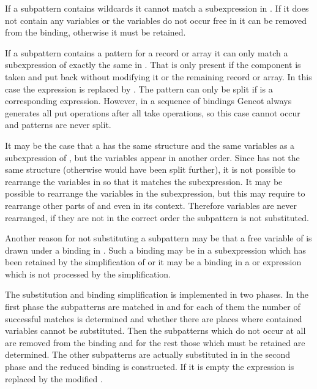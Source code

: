 If a subpattern  contains wildcards it cannot match a subexpression in . If it does not contain any variables
or the variables do not occur free in  it can be removed from the binding, otherwise it must be retained.

If a subpattern  contains a  pattern for a record or array it can only match a  subexpression 
of exactly the same in . That is only present if the component is taken and put back without modifying it or the 
remaining record or array. In this case the  expression is replaced by . 
The  pattern can only be split if  is a corresponding  expression. However, in a sequence
of bindings Gencot always generates all put operations after all take operations, so this case cannot occur and  
patterns are never split.

It may be the case that a  has the same structure and the same variables as a subexpression of , but the
variables appear in another order. Since  has not the same structure (otherwise  would have been split
further), it is not possible to rearrange the variables in  so that it matches the subexpression. It may be possible 
to rearrange the variables in the subexpression, but this may require to rearrange other parts of  and even in 
its context. Therefore variables are never rearranged, if they are not in the correct order the subpattern is not substituted.

Another reason for not substituting a subpattern  may be that a free variable of  is drawn under a binding
in . Such a binding may be in a  subexpression which has been retained by the simplification of 
or it may be a binding in a  or  expression which is not processed by the simplification.

The substitution and binding simplification is implemented in two phases. In the first phase the subpatterns are matched in 
 and for each of them the number of successful matches is determined and whether there are places where contained 
variables cannot be substituted. Then the subpatterns which do not occur at all are removed from the binding and for the rest
those which must be retained are determined. The other subpatterns are actually substituted in  in the second phase 
and the reduced binding is constructed. If it is empty the  expression is replaced by the modified .

